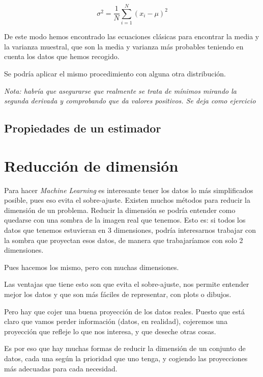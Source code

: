 \documentclass[a4paper,10pt]{article}
\begin{document}
\begin{equation*}
\sigma^2 = \frac{1}{N}\sum_{i = 1}^{N} (x_i - \mu)^2
\end{equation*}

De este modo hemos encontrado las ecuaciones clásicas para encontrar la media y la varianza muestral, que son la media y varianza más probables teniendo en cuenta los datos que hemos recogido.

Se podría aplicar el mismo procedimiento con alguna otra distribución.

\hspace{1cm}

\textit{Nota: habría que asegurarse que realmente se trata de mínimos mirando la segunda derivada y comprobando que da valores positivos. Se deja como ejercicio}

\subsection{Propiedades de un estimador}




\section{Reducción de dimensión}
Para hacer \textit{Machine Learning} es interesante tener los datos lo más simplificados posible, pues eso evita el sobre-ajuste. Existen muchos métodos para reducir la dimensión de un problema. Reducir la dimensión se podría entender como quedarse con una sombra de la imagen real que tenemos. Esto es: si todos los datos que tenemos estuvieran en 3 dimensiones, podría interesarnos trabajar con la sombra que proyectan esos datos, de manera que trabajaríamos con solo 2 dimensiones.

Pues hacemos los mismo, pero con muchas dimensiones.

Las ventajas que tiene esto son que evita el sobre-ajuste, nos permite entender mejor los datos y que son más fáciles de representar, con plots o dibujos.

Pero hay que cojer una buena proyección de los datos reales. Puesto que está claro que vamos perder información (datos, en realidad), cojeremos una proyección que refleje lo que nos interesa, y que deseche otras cosas.

Es por eso que hay muchas formas de reducir la dimensión de un conjunto de datos, cada una según la prioridad que uno tenga, y cogiendo las proyecciones más adecuadas para cada necesidad.
\end{document}
